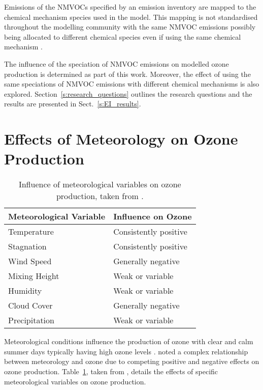 Emissions of the NMVOCs specified by an emission inventory are mapped to the chemical mechanism species used in the model.
This mapping is not standardised throughout the modelling community with the same NMVOC emissions possibly being allocated to different chemical species even if using the same chemical mechanism \citep{Carter:2015}.

The influence of the speciation of NMVOC emissions on modelled ozone production is determined as part of this work.
Moreover, the effect of using the same speciations of NMVOC emissions with different chemical mechanisms is also explored.
Section~\ref{s:research_questions} outlines the research questions and the results are presented in Sect.~\ref{s:EI_results}.

\section{Effects of Meteorology on Ozone Production} \label{s:meteo_ozone}
\begin{table}[t]%
    \centering%
    \caption[Influence of meteorological variables on ozone production]{Influence of meteorological variables on ozone production, taken from \citet{Jacob:2009}.}%
    \begin{tabular}{ll}%
        \hline \hline
        \textbf{Meteorological Variable} & \textbf{Influence on Ozone} \\
        \hline \hline
        Temperature & Consistently positive \\
        Stagnation & Consistently positive \\
        Wind Speed & Generally negative \\
        Mixing Height & Weak or variable \\
        Humidity & Weak or variable \\
        Cloud Cover & Generally negative \\
        Precipitation & Weak or variable \\
        \hline \hline
    \end{tabular}%
    \label{t:meteo_vars}%
\end{table}%
Meteorological conditions influence the production of ozone with clear and calm summer days typically having high ozone levels \citep{Duenas:2002}.
\citet{Comrie:1997} noted a complex relationship between meteorology and ozone due to competing positive and negative effects on ozone production.
Table~\ref{t:meteo_vars}, taken from \citet{Jacob:2009}, details the effects of specific meteorological variables on ozone production.


